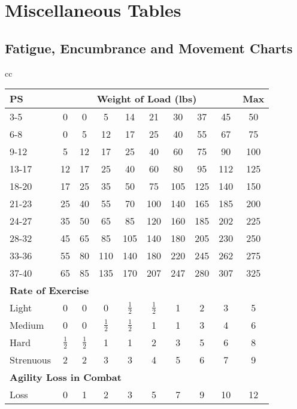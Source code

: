 \section{Miscellaneous Tables}

\subsection{Fatigue, Encumbrance and Movement Charts}
\label{tables:encumbrance}
\label{tables:tmr}

\begin{tabular}[t]{cc}
{\fontsize{8}{11pt}\selectfont
\begin{tabular}[t]{l@{\hspace{1.8em}}c@{\hspace{1.8em}}c@{\hspace{1.8em}}c@{\hspace{1.8em}}c@{\hspace{1.8em}}c@{\hspace{1.8em}}c@{\hspace{1.8em}}c@{\hspace{1.8em}}c@{\hspace{1.8em}}c}
\textbf{PS} & \multicolumn{8}{c}{\textbf{Weight of Load (lbs)}} & \textbf{Max} \\ \hline
3-5	&0	&0	&5	&14	&21	&30	&37	&45	&50 \\ \hline
6-8	&0	&5	&12	&17	&25	&40	&55	&67	&75 \\ \hline
9-12	&5	&12	&17	&25	&40	&60	&75	&90	&100 \\ \hline
13-17	&12	&17	&25	&40	&60	&80	&95	&112	&125 \\ \hline
18-20	&17	&25	&35	&50	&75	&105	&125	&140	&150 \\ \hline
21-23	&25	&40	&55	&70	&100	&140	&165	&185	&200 \\ \hline
24-27	&35	&50	&65	&85	&120	&160	&185	&202	&225 \\ \hline
28-32	&45	&65	&85	&105	&140	&180	&205	&230	&250 \\ \hline
33-36	&55	&80	&110	&140	&180	&220	&245	&262	&275 \\ \hline
37-40	&65	&85	&135	&170	&207	&247	&280	&307	&325 \\ \hline
\multicolumn{10}{l}{\textbf{Rate of Exercise}} \\
Light	&0	&0	&0	&$\frac{1}{2}$&$\frac{1}{2}$&1	&2	&3	&5 \\ \hline
Medium	&0	&0	&$\frac{1}{2}$&$\frac{1}{2}$&1	&1	&3	&4	&6 \\ \hline
Hard	&$\frac{1}{2}$&$\frac{1}{2}$&1	&1	&2	&3	&5	&6	&8 \\ \hline
Strenuous&2	&2	&3	&3	&4	&5	&6	&7	&9 \\ \hline
\multicolumn{10}{l}{\textbf{Agility Loss in Combat}} \\
Loss	 &0	&1	&2	&3	&5	&7	&9	&10	&12 \\ \hline
\end{tabular}}


\end{tabular}
